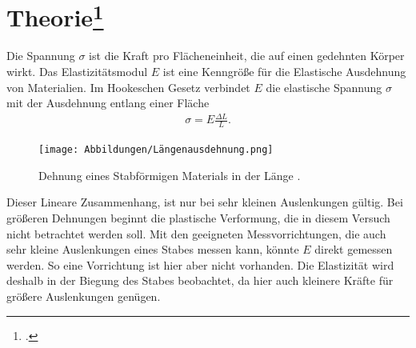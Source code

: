 \section[Theorie]{Theorie\footcite{man:v103}}
Die Spannung $\sigma$ ist die Kraft pro Flächeneinheit, die auf einen gedehnten Körper wirkt.
Das Elastizitätsmodul $E$ ist eine Kenngröße für die Elastische Ausdehnung von Materialien. %
Im Hookeschen Gesetz verbindet $E$ die elastische Spannung $\sigma$ mit der Ausdehnung entlang einer Fläche
\begin{align}
    \sigma = E \frac{\Delta L}{L}.
    \label{eq:Hook_Gesetz}
\end{align}
\begin{figure}[H]
    \centering
    \texttt{[image: Abbildungen/Längenausdehnung.png]}
    \caption{Dehnung eines Stabförmigen Materials in der Länge \cite{man:v103}.}
    \label{fig:laengenausdehnung}
\end{figure}
\noindent
Dieser Lineare Zusammenhang, ist nur bei sehr kleinen Auslenkungen gültig.
Bei größeren Dehnungen beginnt die plastische Verformung, die in diesem Versuch nicht betrachtet werden soll.
Mit den geeigneten Messvorrichtungen, die auch sehr kleine Auslenkungen eines Stabes messen kann, 
könnte $E$ direkt gemessen werden.
So eine Vorrichtung ist hier aber nicht vorhanden. 
Die Elastizität wird deshalb in der Biegung des Stabes beobachtet, da hier auch kleinere Kräfte für größere Auslenkungen genügen.

